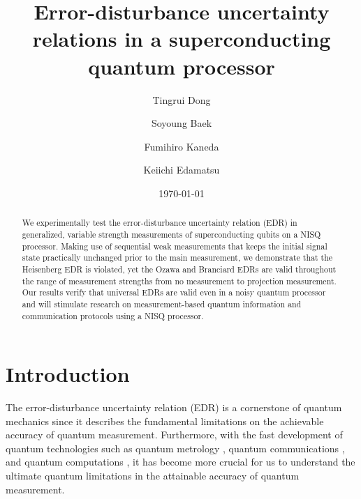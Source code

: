 \documentclass[%
reprint,
superscriptaddress,
 amsmath,amssymb,
 aps,
pra,
]{revtex4-2}
\begin{document}
\title{Error-disturbance uncertainty relations in a superconducting quantum processor}
\author{Tingrui Dong}
\author{Soyoung Baek}
\author{Fumihiro Kaneda}
\author{Keiichi Edamatsu}

\date{\today}

\begin{abstract}
We experimentally test the error-disturbance uncertainty relation (EDR) in generalized, variable strength measurements of superconducting qubits on a NISQ processor. 
Making use of sequential weak measurements that keeps the initial signal state practically unchanged prior to the main measurement, we demonstrate that the Heisenberg EDR is violated, yet the Ozawa and Branciard EDRs are valid throughout the range of measurement strengths from no measurement to projection measurement. 
Our results verify that universal EDRs are valid even in a noisy quantum processor and will stimulate research on measurement-based quantum information and communication protocols using a NISQ processor.
\end{abstract}

\maketitle
\section{Introduction\label{sec:introduction}}

The error-disturbance uncertainty relation (EDR) is a cornerstone of quantum mechanics since it describes the fundamental limitations on the achievable accuracy of quantum measurement. 
Furthermore, with the fast development of quantum technologies such as quantum metrology \cite{10.1038/nphoton.2013.150}, quantum communications \cite{10.1007/3-540-53862-3_161}, and quantum computations \cite{nielsen_chuang_2010}, it has become more crucial for us to understand the ultimate quantum limitations in the attainable accuracy of quantum measurement. 
\end{document}
